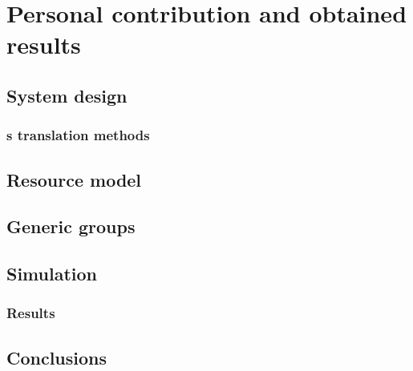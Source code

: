 \section{Personal contribution and obtained results}

\subsection{System design}

\subsubsection{\texorpdfstring{}{Composite}s translation methods}

\subsection{Resource model}

\subsection{Generic groups}

\subsection{Simulation}

\subsubsection{Results}

\subsection{Conclusions}




